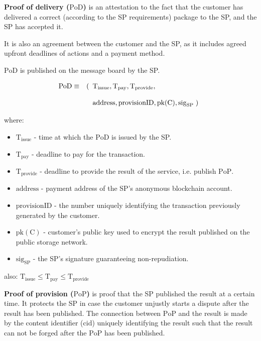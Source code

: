 \documentclass[pdftex,twocolumn,epjc3]{svjour3}
\begin{document}
{\noindent \textbf
{Proof of delivery ($\mathrm{PoD}$)}\label{proof-of-delivery} is an attestation to the fact that the customer has delivered a correct (according to the SP requirements) package to the SP, and the SP has accepted it.

It is also an agreement between the customer and the SP, as it includes agreed upfront deadlines of actions and a payment method.

$\mathrm{PoD}$ is published on the message board by the SP.

\begin{eqnarray}
\mathrm{PoD} & \equiv & (\begin{array}[t]{l}\mathrm{T}_\mathrm{issue}, \mathrm{T}_\mathrm{pay}, \mathrm{T}_\mathrm{provide}, \\\\ \mathrm{address}, \mathrm{provisionID}, \mathrm{pk(C)}, \mathrm{sig}_\mathrm{SP} \; )\end{array}
\end{eqnarray}

where:

\begin{itemize}

\item $\mathrm{T}_\mathrm{issue}$ - time at which the $\mathrm{PoD}$ is issued by the SP.
\item
  $\mathrm{T}_\mathrm{pay}$ - deadline to pay for the transaction.
\item
  $\mathrm{T}_\mathrm{provide}$ - deadline to provide the result of the service, i.e. publish $\mathrm{PoP}$.
\item $\mathrm{address}$ - payment address of the SP's anonymous blockchain account.
\item $\mathrm{provisionID}$ - the number uniquely identifying the transaction previously generated by the customer.
\item $\mathrm{pk(C)}$ - customer's public key used to encrypt the result published on the public storage network.
\item $\mathrm{sig}_\mathrm{SP}$ - the SP's signature guaranteeing non-repudiation.
\end{itemize}

also:
\(\mathrm{T}_\mathrm{issue} \leq \mathrm{T}_\mathrm{pay} \leq \mathrm{T}_\mathrm{provide}\)

\noindent \textbf
{Proof of provision ($\mathrm{PoP}$)}\label{proof-of-provision} is proof that the SP published the result at a certain time. It protects the SP in case the customer unjustly starts a dispute after the result has been published. The connection between $\mathrm{PoP}$ and the result is made by the content identifier ($\mathrm{cid}$) uniquely identifying the result such that the result can not be forged after the $\mathrm{PoP}$ has been published.

}
\end{document}
